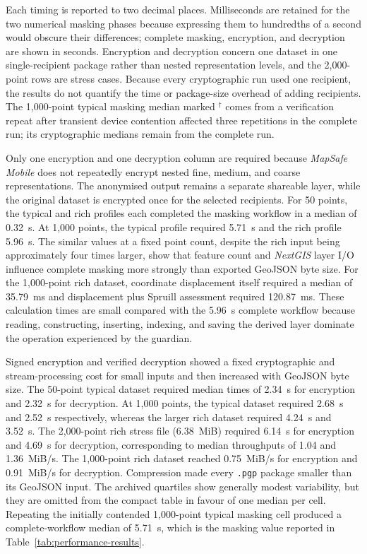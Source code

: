 \documentclass[]{interact}
\begin{document}
\noindent Each timing is reported to two decimal places. Milliseconds are retained for the two numerical masking phases because expressing them to hundredths of a second would obscure their differences; complete masking, encryption, and decryption are shown in seconds. Encryption and decryption concern one dataset in one single-recipient package rather than nested representation levels, and the 2,000-point rows are stress cases. Because every cryptographic run used one recipient, the results do not quantify the time or package-size overhead of adding recipients. The 1,000-point typical masking median marked $^{\dagger}$ comes from a verification repeat after transient device contention affected three repetitions in the complete run; its cryptographic medians remain from the complete run.

Only one encryption and one decryption column are required because \textit{MapSafe Mobile} does not repeatedly encrypt nested fine, medium, and coarse representations. The anonymised output remains a separate shareable layer, while the original dataset is encrypted once for the selected recipients. For 50 points, the typical and rich profiles each completed the masking workflow in a median of 0.32~s. At 1,000 points, the typical profile required 5.71~s and the rich profile 5.96~s. The similar values at a fixed point count, despite the rich input being approximately four times larger, show that feature count and \textit{NextGIS} layer I/O influence complete masking more strongly than exported GeoJSON byte size. For the 1,000-point rich dataset, coordinate displacement itself required a median of 35.79~ms and displacement plus Spruill assessment required 120.87~ms. These calculation times are small compared with the 5.96~s complete workflow because reading, constructing, inserting, indexing, and saving the derived layer dominate the operation experienced by the guardian.

Signed encryption and verified decryption showed a fixed cryptographic and stream-processing cost for small inputs and then increased with GeoJSON byte size. The 50-point typical dataset required median times of 2.34~s for encryption and 2.32~s for decryption. At 1,000 points, the typical dataset required 2.68~s and 2.52~s respectively, whereas the larger rich dataset required 4.24~s and 3.52~s. The 2,000-point rich stress file (6.38~MiB) required 6.14~s for encryption and 4.69~s for decryption, corresponding to median throughputs of 1.04 and 1.36~MiB/s. The 1,000-point rich dataset reached 0.75~MiB/s for encryption and 0.91~MiB/s for decryption. Compression made every \texttt{.pgp} package smaller than its GeoJSON input. The archived quartiles show generally modest variability, but they are omitted from the compact table in favour of one median per cell. Repeating the initially contended 1,000-point typical masking cell produced a complete-workflow median of 5.71~s, which is the masking value reported in Table~\ref{tab:performance-results}.
\end{document}

